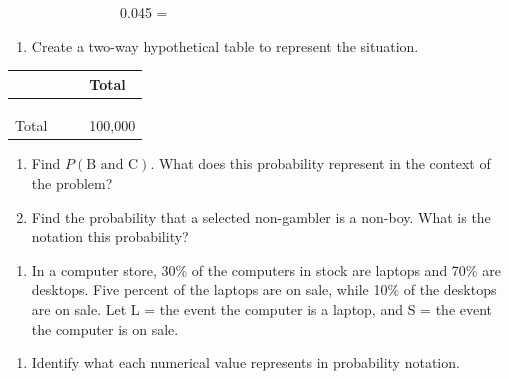 \documentclass[
]{report}
\providecommand{\tightlist}{%
  \setlength{\itemsep}{0pt}\setlength{\parskip}{0pt}}
\begin{document}
\vspace{.2in}

~~~~~~~~~~~~~~~~0.045 =

\vspace{.2in}

\begin{enumerate}
\def\labelenumi{\alph{enumi}.}
\setcounter{enumi}{2}
\tightlist
\item
  Create a two-way hypothetical table to represent the situation.
\end{enumerate}

\begin{longtable}[]{@{}llll@{}}
\toprule
\hspace{1in} & \hspace{1in} & \hspace{1in} & Total\tabularnewline
\midrule
\endhead
\hspace{1in} & & &\tabularnewline
\hspace{1in} & & &\tabularnewline
\hspace{1in} & & &\tabularnewline
Total & & & 100,000\tabularnewline
\bottomrule
\end{longtable}

\begin{enumerate}
\def\labelenumi{\alph{enumi}.}
\setcounter{enumi}{3}
\item
  Find \(P(\mbox{B and C})\). What does this probability represent in the context of the problem?
  \vspace{1in}
\item
  Find the probability that a selected non-gambler is a non-boy. What is the notation this probability?
\end{enumerate}

\newpage

\begin{enumerate}
\def\labelenumi{\arabic{enumi}.}
\setcounter{enumi}{9}
\tightlist
\item
  In a computer store, 30\% of the computers in stock are laptops and 70\% are desktops. Five percent of the laptops are on sale, while 10\% of the desktops are on sale. Let L = the event the computer is a laptop, and S = the event the computer is on sale.
  \vspace{0.1in}
\end{enumerate}

\begin{enumerate}
\def\labelenumi{\alph{enumi}.}
\tightlist
\item
  Identify what each numerical value represents in probability notation.
  \vspace{.1in}
\end{enumerate}
\end{document}
